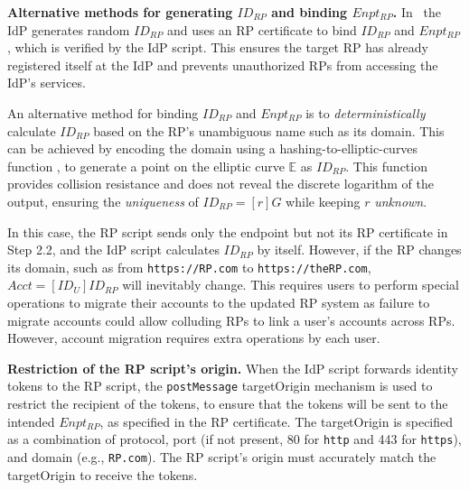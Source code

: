 \vspace{0.75mm}
\noindent \textbf{Alternative methods for generating $ID_{RP}$ and binding $Enpt_{RP}$.}
In \usso\ the IdP generates random $ID_{RP}$ and uses an RP certificate to bind $ID_{RP}$ and $Enpt_{RP}$, which is verified by the IdP script.
This ensures the target RP has already registered itself at the IdP and prevents unauthorized RPs from accessing the IdP's services.

An alternative method for binding $ID_{RP}$ and $Enpt_{RP}$ is
 to \emph{deterministically} calculate $ID_{RP}$ based on the RP's unambiguous name such as its domain.
 This can be achieved by encoding the domain using a hashing-to-elliptic-curves function \cite{irtf-cfrg-hash-to-curve-16},
  to generate a point on the elliptic curve $\mathbb{E}$ as $ID_{RP}$.
This function \cite{irtf-cfrg-hash-to-curve-16} provides collision resistance
 and does not reveal the discrete logarithm of the output,
  ensuring the \emph{uniqueness} of $ID_{RP} = [r]G$ while keeping $r$ \emph{unknown}. %

In this case, the RP script sends only the endpoint but not its RP certificate in Step 2.2, and the IdP script calculates $ID_{RP}$ by itself. %
However, if the RP changes its domain, such as from \verb+https://RP.com+ to \verb+https://theRP.com+,
$Acct = [ID_U]ID_{RP}$ will inevitably change.
This requires users to perform special operations to migrate their accounts to the updated RP system
 as failure to migrate accounts could allow colluding RPs to link a user's accounts across RPs.
 However, account migration requires extra operations by each user.

\vspace{0.75mm}
\noindent \textbf{Restriction of the RP script's origin.}
When the IdP script forwards identity tokens to the RP script, the \verb+postMessage+ targetOrigin mechanism \cite{postm-targeto} is used to restrict the recipient of the tokens, to ensure that the tokens will be sent to the intended $Enpt_{RP}$, as specified in the RP certificate. The targetOrigin is specified as a combination of protocol, port (if not present, 80 for \verb+http+ and 443 for \verb+https+), and domain (e.g., \verb+RP.com+).
The RP script's origin must accurately match the targetOrigin to receive the tokens.

